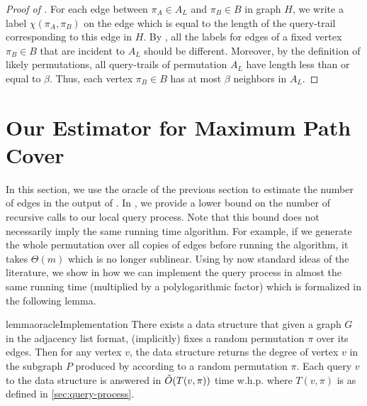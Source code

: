 \documentclass[letterpaper,11pt]{article}
\newcommand{\algtwo}[0]{\Cref{alg:path-cover22}}
\begin{document}
\begin{proof}[Proof of ]
For each edge between $\pi_A \in A_L$ and $\pi_B \in B$ in graph $H$, we write a label $\chi(\pi_A, \pi_B)$ on the edge which is equal to the length of the query-trail corresponding to this edge in $H$. By , all the labels for edges of a fixed vertex $\pi_B \in B$ that are incident to $A_L$ should be different. Moreover, by the definition of likely permutations, all query-trails of permutation $A_L$ have length less than or equal to $\beta$. Thus, each vertex $\pi_B \in B$ has at most $\beta$ neighbors in $A_L$.
\end{proof}










\section{Our Estimator for Maximum Path Cover}\label{sec: disjoint-paths-estimate}
In this section, we use the oracle of the previous section to estimate the number of edges in the output of \algtwo{}. In , we provide a lower bound on the number of recursive calls to our local query process. Note that this bound does not necessarily imply the same running time algorithm. For example, if we generate the whole permutation over all copies of edges before running the algorithm, it takes $\Theta(m)$ which is no longer sublinear. Using by now standard ideas of the literature, we show in  how we can implement the query process in almost the same running time (multiplied by a polylogarithmic factor) which is formalized in the following lemma.



\begin{restatable}{lemma}{oracleImplementation}\label{lem: implementation}
There exists a data structure that given a graph $G$ in the adjacency list format, (implicitly) fixes a random permutation $\pi$ over its edges. Then for any vertex $v$, the data structure returns the degree of vertex $v$ in the subgraph $P$ produced by \algtwo{} according to a random permutation $\pi$. Each query $v$ to the data structure is answered in $\Tilde{O}(T(v, \pi))$ time w.h.p. where $T(v, \pi)$ is as defined in \cref{sec:query-process}.
\end{restatable}
\end{document}
